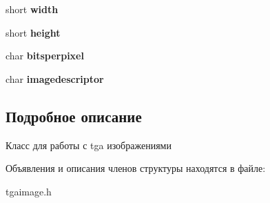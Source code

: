 \begin{DoxyCompactItemize}
short {\bfseries width}
\item 
\mbox{\label{structTGA__Header_aacb2e40eb0f21ab15c575b2b08f745a9}} 
short {\bfseries height}
\item 
\mbox{\label{structTGA__Header_a7a9321ace0441f691b3ba8339d0402f6}} 
char {\bfseries bitsperpixel}
\item 
\mbox{\label{structTGA__Header_ab98d3cc85b761324b084565880b7c306}} 
char {\bfseries imagedescriptor}
\end{DoxyCompactItemize}


\subsection{Подробное описание}
Класс для работы с tga изображениями 

Объявления и описания членов структуры находятся в файле\+:\begin{DoxyCompactItemize}
\item 
tgaimage.\+h\end{DoxyCompactItemize}
